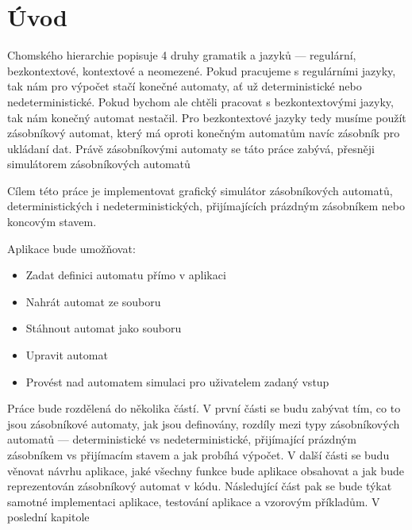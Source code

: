 \chapter{Úvod}    
    Chomského hierarchie popisuje 4 druhy gramatik a jazyků --- regulární, bezkontextové, kontextové a neomezené. Pokud pracujeme s regulárními jazyky, tak nám pro výpočet stačí konečné automaty, ať už deterministické nebo nedeterministické. Pokud bychom ale chtěli pracovat s bezkontextovými jazyky, tak nám konečný automat nestačil. Pro bezkontextové jazyky tedy musíme použít zásobníkový automat, který má oproti konečným automatům navíc zásobník pro ukládaní dat. Právě zásobníkovými automaty se táto práce zabývá, přesněji simulátorem zásobníkových automatů

    Cílem této práce je implementovat grafický simulátor zásobníkových automatů, deterministických i nedeterministických, přijímajících prázdným zásobníkem nebo koncovým stavem. 
    
    Aplikace bude umožňovat:

    \begin{itemize}
        \item Zadat definici automatu přímo v aplikaci
        \item Nahrát automat ze souboru
        \item Stáhnout automat jako souboru
        \item Upravit automat
        \item Provést nad automatem simulaci pro uživatelem zadaný vstup
    \end{itemize}

    Práce bude rozdělená do několika částí. V první části se budu zabývat tím, co to jsou zásobníkové automaty, jak jsou definovány, rozdíly mezi typy zásobníkových automatů --- deterministické vs nedeterministické, přijímající prázdným zásobníkem vs přijímacím stavem a jak probíhá výpočet. V další části se budu věnovat návrhu aplikace, jaké všechny funkce bude aplikace obsahovat a jak bude reprezentován zásobníkový automat v kódu. Následující část pak se bude týkat samotné implementaci aplikace, testování aplikace a vzorovým příkladům. V poslední kapitole %
\endinput